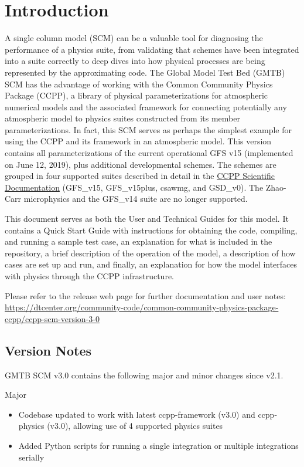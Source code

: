 \chapter{Introduction}
\label{chapter: introduction}

A single column model (SCM) can be a valuable tool for diagnosing the performance of a physics suite, from validating that schemes have been integrated into a suite correctly to deep dives into how physical processes are being represented by the approximating code. The Global Model Test Bed (GMTB) SCM has the advantage of working with the Common Community Physics Package (CCPP), a library of physical parameterizations for atmospheric numerical models and the associated framework for connecting potentially any atmospheric model to physics suites constructed from its member parameterizations. In fact, this SCM serves as perhaps the simplest example for using the CCPP and its framework in an atmospheric model. This version contains all parameterizations of the current operational GFS v15 (implemented on June 12, 2019), plus additional developmental schemes. The schemes are grouped in four supported suites described in detail in the \href{https://dtcenter.org/GMTB/v3.0/sci\_doc/}{CCPP Scientific Documentation} (GFS\_v15, GFS\_v15plus, csawmg, and GSD\_v0). The Zhao-Carr microphysics and the GFS\_v14 suite are no longer supported.

This document serves as both the User and Technical Guides for this model. It contains a Quick Start Guide with instructions for obtaining the code, compiling, and running a sample test case, an explanation for what is included in the repository, a brief description of the operation of the model, a description of how cases are set up and run, and finally, an explanation for how the model interfaces with physics through the CCPP infrastructure.

Please refer to the release web page for further documentation and user notes:\\ \url{https://dtcenter.org/community-code/common-community-physics-package-ccpp/ccpp-scm-version-3-0}

\section{Version Notes}

GMTB SCM v3.0 contains the following major and minor changes since v2.1.

Major
\begin{itemize}
\item Codebase updated to work with latest ccpp-framework (v3.0) and ccpp-physics (v3.0), allowing use of 4 supported physics suites
\item Added Python scripts for running a single integration or multiple integrations serially
\end{itemize}

